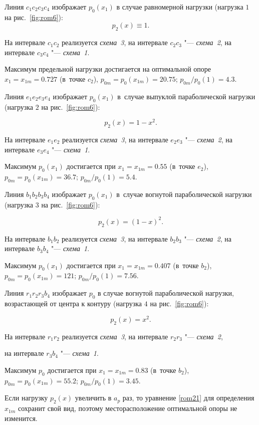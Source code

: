 Линия $c_1c_2c_3c_4$ изображает $p_0(x_1)$ в случае равномерной нагрузки (нагрузка $1$ на рис.~\ref{fig:rom6}): $$p_2(x)\equiv1 .$$

На интервале $c_1c_2$ реализуется {\sl схема~3}, на интервале $c_2c_3$ "--- {\sl схема~2}, на интервале $c_3c_4$ "--- {\sl схема~1}.

Максимум предельной нагрузки достигается на оптимальной опоре $x_1=x_{1m}=0.727$ (в~точке $c_2$), $p_{0m}=p_0(x_{1m})=20.75$; $p_{0m}/p_0(1)=4.3$.



Линия $e_1e_2e_3e_4$ изображает  $p_0(x_1)$ в~случае выпуклой параболической нагрузки (нагрузка $2$ на рис.~\ref{fig:rom6}):

$$p_2(x)=1-x^2.$$

На интервале $e_1e_2$ реализуется {\sl схема~3}, на интервале $e_2e_3$ "--- {\sl схема~2}, на интервале $e_3e_4$ "--- {\sl схема~1}.

Максимум $p_0(x_1)$ достигается при $x_1=x_{1m}=0.55$ (в~точке $e_2$), $p_{0m}=p_0(x_{1m})=36.7$; $p_{0m}/p_0(1)=5.4$.



Линия $b_1b_2b_3b_4$ изображает $p_0(x_1)$ в~случае вогнутой параболической нагрузки (нагрузка $3$ на рис.~\ref{fig:rom6}):

$$p_2(x)=(1-x)^2.$$

На интервале $b_1b_2$ реализуется {\sl схема~3}, на интервале $b_2b_3$ "--- {\sl схема~2}, на интервале $b_3b_4$ "--- {\sl схема~1}.

Максимум $p_0(x_1)$ достигается при $x_1=x_{1m}=0.407$ (в~точке $b_2$), $p_{0m}=p_0(x_{1m})=121$; $p_{0m}/p_0(1)=7.56$.



Линия $r_1r_2r_3b_4$ изображает $p_0$ в случае вогнутой параболической нагрузки, возрастающей от центра к контуру (нагрузка $4$ на рис.~\ref{fig:rom6}):

$$p_2(x)=x^2.$$

На интервале $r_1r_2$ реализуется {\sl схема~3}, на интервале $r_2r_3$ "--- {\sl схема~2},

на интервале $r_3b_4$ "--- {\sl схема~1}.

Максимум $p_0$ достигается при $x_1=x_{1m}=0.83$ (в~точке $b_2$), $p_{0m}=p_0(x_{1m})=55.2$; $p_{0m}/p_0(1)=3.45$.



Если нагрузку $p_2(x)$ увеличить в $a_p$ раз, то уравнение \eqref{rom21} для определения $x_{1m}$ сохранит свой вид, поэтому месторасположение оптимальной опоры не изменится.

